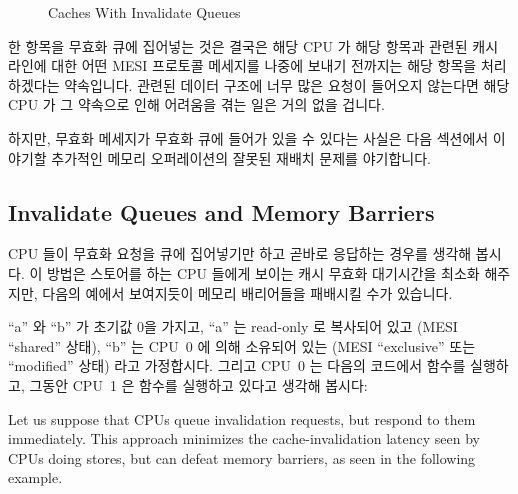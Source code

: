 \begin{figure}[htb]
\centering
{}
\caption{Caches With Invalidate Queues}
\label{fig:app:whymb:Caches With Invalidate Queues}
\end{figure}

한 항목을 무효화 큐에 집어넣는 것은 결국은 해당 CPU 가 해당 항목과 관련된 캐시
라인에 대한 어떤 MESI 프로토콜 메세지를 나중에 보내기 전까지는 해당 항목을
처리하겠다는 약속입니다.
관련된 데이터 구조에 너무 많은 요청이 들어오지 않는다면 해당 CPU 가 그 약속으로
인해 어려움을 겪는 일은 거의 없을 겁니다.

하지만, 무효화 메세지가 무효화 큐에 들어가 있을 수 있다는 사실은 다음 섹션에서
이야기할 추가적인 메모리 오퍼레이션의 잘못된 재배치 문제를 야기합니다.

\subsection{Invalidate Queues and Memory Barriers}
\label{sec:app:whymb:Invalidate Queues and Memory Barriers}

CPU 들이 무효화 요청을 큐에 집어넣기만 하고 곧바로 응답하는 경우를 생각해
봅시다.
이 방법은 스토어를 하는 CPU 들에게 보이는 캐시 무효화 대기시간을 최소화
해주지만, 다음의 예에서 보여지듯이 메모리 배리어들을 패배시킬 수가 있습니다.

``a'' 와 ``b'' 가 초기값 0을 가지고, ``a'' 는 read-only 로 복사되어 있고 (MESI
``shared'' 상태), ``b'' 는 CPU~0 에 의해 소유되어 있는 (MESI ``exclusive'' 또는
``modified'' 상태) 라고 가정합시다.
그리고 CPU~0 는 다음의 코드에서  함수를 실행하고, 그동안 CPU~1 은
  함수를 실행하고 있다고 생각해 봅시다:
\iffalse

Let us suppose that CPUs queue invalidation requests, but respond to
them immediately.
This approach minimizes the cache-invalidation latency seen by CPUs
doing stores, but can defeat memory barriers, as seen in the following
example.

